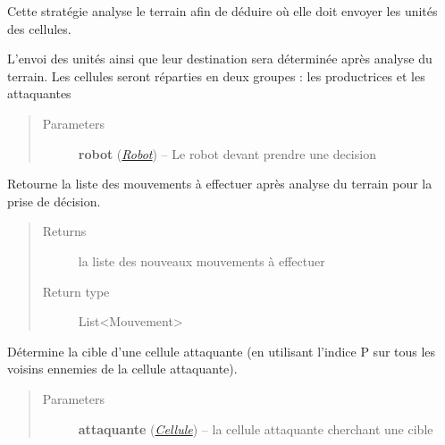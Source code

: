 \documentclass[letterpaper,10pt,english]{sphinxmanual}
\begin{document}
\begin{fulllineitems}
\label{index:StrategieAnalyse.StrategieAnalyse}
Cette stratégie analyse le terrain afin de déduire où elle doit envoyer les unités des cellules.

L'envoi des unités ainsi que leur destination sera déterminée après analyse du terrain.
Les cellules seront réparties en deux groupes : les productrices et les attaquantes
\begin{quote}\begin{description}
\item[{Parameters}] \leavevmode
\textbf{robot} ({\hyperref[index:module-Robot]{\emph{Robot}}}) -- Le robot devant prendre une decision

\end{description}\end{quote}

\begin{fulllineitems}
\label{index:StrategieAnalyse.StrategieAnalyse.decider}
Retourne la liste des mouvements à effectuer après analyse du terrain pour la prise de décision.
\begin{quote}\begin{description}
\item[{Returns}] \leavevmode
la liste des nouveaux mouvements à effectuer

\item[{Return type}] \leavevmode
List\textless{}Mouvement\textgreater{}

\end{description}\end{quote}

\end{fulllineitems}


\begin{fulllineitems}
\label{index:StrategieAnalyse.StrategieAnalyse.determinerCible}
Détermine la cible d'une cellule attaquante (en utilisant l'indice P sur tous les voisins ennemies de la cellule attaquante).
\begin{quote}\begin{description}
\item[{Parameters}] \leavevmode
\textbf{attaquante} ({\hyperref[index:module-Cellule]{\emph{Cellule}}}) -- la cellule attaquante cherchant une cible


\end{description}
\end{quote}
\end{fulllineitems}
\end{fulllineitems}
\end{document}
